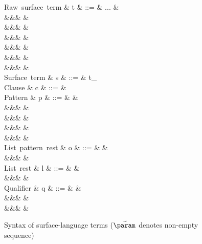 \begin{figure}[H]
\begin{syntaxfig}
\mbox{Raw surface term}
&
t
&
::=
&
...
&
\\
&&&
&
\\
&&&
&
\\
&&&
&
\\
&&&
&
\\
&&&
&
\\
&&&
&
\\[2mm]

\mbox{Surface term}
&
s
&
::=
&
t_{\alpha}
\\[2mm]

\mbox{Clause}
&
c
&
::=
&
\\[2mm]

\mbox{Pattern}
&
p
&
::=
&
&
\\
&&&
\pattNil
&
\\
&&&
&
\\
&&&
&
\\
&&&
&
\\[2mm]

\mbox{List pattern rest}
&
o
&
::=
&
\pattSNil
&
\\
&&&
&
\\[2mm]

\mbox{List rest}
&
l
&
::=
&
\annot{\sExNil}{\alpha}
&
\\
&&&
&
\\[2mm]

\mbox{Qualifier}
&
q
&
::=
&
&
\\
&&&
&
\\
&&&
&
\\[2mm]

\end{syntaxfig}
\caption{Syntax of surface-language terms ($\vec{\param}$ denotes non-empty sequence)}
\end{figure}
